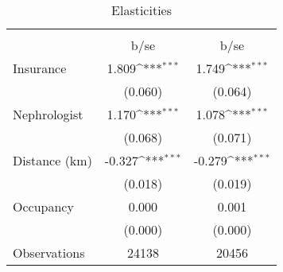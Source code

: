\begin{table}[htbp]\centering
\def\sym#1{\ifmmode^{#1}\else\(^{#1}\)\fi}
\caption{Elasticities}
\begin{tabular}{l*{2}{c}}
\toprule
                    &\multicolumn{1}{c}{} &\multicolumn{1}{c}{} \\
                    &        b/se         &        b/se         \\
\midrule
Insurance           &       1.809\sym{***}&       1.749\sym{***}\\
                    &     (0.060)         &     (0.064)         \\
Nephrologist        &       1.170\sym{***}&       1.078\sym{***}\\
                    &     (0.068)         &     (0.071)         \\
Distance (km)       &      -0.327\sym{***}&      -0.279\sym{***}\\
                    &     (0.018)         &     (0.019)         \\
Occupancy           &       0.000         &       0.001         \\
                    &     (0.000)         &     (0.000)         \\
\midrule
Observations        &       24138         &       20456         \\
\bottomrule
\end{tabular}
\end{table}
